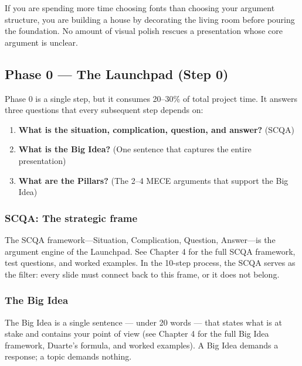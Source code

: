 \begin{alertbox}
If you are spending more time choosing fonts than choosing your argument structure, you are building a house by decorating the living room before pouring the foundation. No amount of visual polish rescues a presentation whose core argument is unclear.
\end{alertbox}

\subsection{Phase 0 --- The Launchpad (Step 0)}

Phase 0 is a single step, but it consumes 20--30\% of total project time. It answers three questions that every subsequent step depends on:

\begin{enumerate}
  \item \textbf{What is the situation, complication, question, and answer?} (SCQA)
  \item \textbf{What is the Big Idea?} (One sentence that captures the entire presentation)
  \item \textbf{What are the Pillars?} (The 2--4 MECE arguments that support the Big Idea)
\end{enumerate}

\subsubsection{SCQA: The strategic frame}

The SCQA framework---Situation, Complication, Question, Answer---is the argument engine of the Launchpad. See Chapter 4 for the full SCQA framework, test questions, and worked examples. In the 10-step process, the SCQA serves as the filter: every slide must connect back to this frame, or it does not belong.

\subsubsection{The Big Idea}

The Big Idea is a single sentence --- under 20 words --- that states what is at stake and contains your point of view (see Chapter 4 for the full Big Idea framework, Duarte's formula, and worked examples). A Big Idea demands a response; a topic demands nothing.

